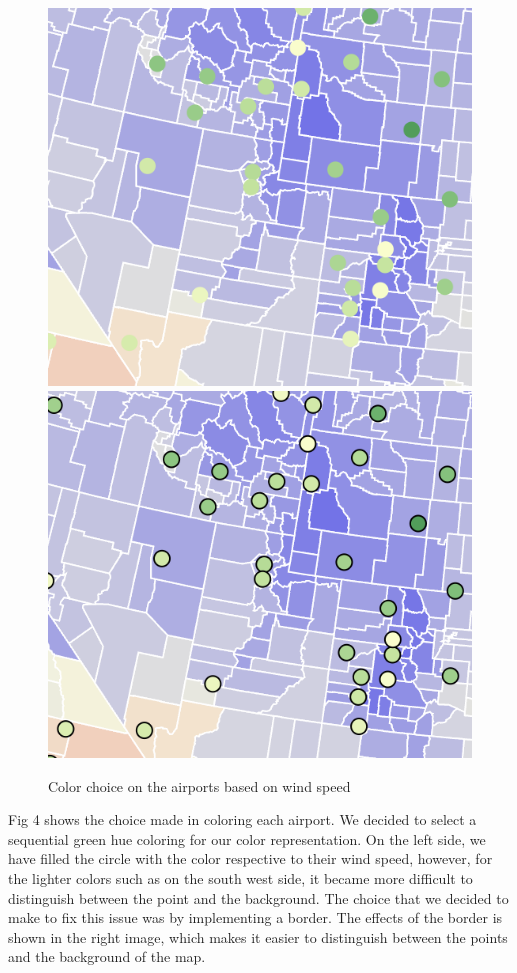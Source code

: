 \documentclass[9pt,twocolumn,twoside]{opticajnl}
\begin{document}
\begin{figure}
    \centering
    \includegraphics[scale=0.45]{images/img5.png}
    \includegraphics[scale=0.45]{images/img4.png}
    \caption{Color choice on the airports based on wind speed}
\end{figure}

Fig 4 shows the choice made in coloring each airport. We decided to select a sequential green hue coloring for our color representation. On the left side, we have filled the circle with the color respective to their wind speed, however, for the lighter colors such as on the south west side, it became more difficult to distinguish between the point and the background. The choice that we decided to make to fix this issue was by implementing a border. The effects of the border is shown in the right image, which makes it easier to distinguish between the points and the background of the map.
\end{document}
